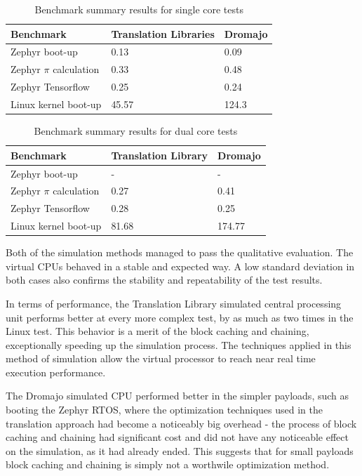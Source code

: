 \begin{table}[h]
    \centering
    \begin{tabular}{l|l|l}
    Benchmark             & Translation Libraries & Dromajo  \\ \hline
    Zephyr boot-up        & 0.13                  & 0.09     \\ \hline
    Zephyr $\pi$ calculation & 0.33               & 0.48     \\ \hline
    Zephyr Tensorflow     & 0.25                  & 0.24     \\ \hline
    Linux kernel boot-up  & 45.57                 & 124.3
    \end{tabular}
    \caption{Benchmark summary results for single core tests}
\end{table}

\begin{table}[h]
    \centering
    \begin{tabular}{l|l|l}
    Benchmark             & Translation Library & Dromajo  \\ \hline
    Zephyr boot-up        & -                   & -        \\ \hline
    Zephyr $\pi$ calculation & 0.27                & 0.41     \\ \hline
    Zephyr Tensorflow     & 0.28                & 0.25     \\ \hline
    Linux kernel boot-up  & 81.68               & 174.77
    \end{tabular}
    \caption{Benchmark summary results for dual core tests}
\end{table}

\noindent
Both of the simulation methods managed to pass the qualitative evaluation. The virtual CPUs behaved in a stable
and expected way. A low standard deviation in both cases also confirms the stability and repeatability of the test
results.

In terms of performance, the Translation Library simulated central processing unit performs better at every more
complex test, by as much as two times in the Linux test. This behavior is a merit of the block caching and chaining,
exceptionally speeding up the simulation process. The techniques applied in this method of simulation allow the virtual
processor to reach near real time execution performance.

The Dromajo simulated CPU performed better in the simpler payloads, such as booting the Zephyr RTOS, where the
optimization techniques used in the translation approach had become a noticeably big overhead - the process of
block caching and chaining had significant cost and did not have any noticeable effect on the simulation, as it had
already ended. This suggests that for small payloads block caching and chaining is simply not a worthwile optimization
method.
